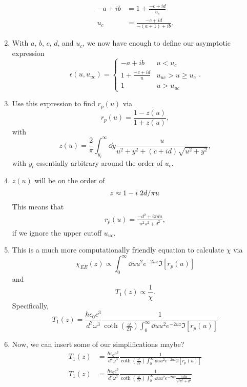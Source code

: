 \documentclass[../main.tex]{subfiles}
\begin{document}
\begin{enumerate}
\begin{align}
			-a + ib &= 1 + \frac{-c + id}{u_c} \\
			u_c &= \frac{-c + id}{-(a + 1) + ib}.
		\end{align}
		\item With $a$, $b$, $c$, $d$, and $u_c$, we now have enough to define our asymptotic expression
		\begin{equation}
			\epsilon(u, u_{uc}) =
			\begin{cases}
				-a + i b & u < u_c \\
				1 + \frac{-c + i d}{u} &  u_{uc} > u \geq u_c \\
				1 & u > u_{uc}
			\end{cases}.
		\end{equation}
		\item Use this expression to find $r_p(u)$ via
		\begin{equation}
			r_p(u) = \frac{1 - z(u)}{1 + z(u)},
		\end{equation}
		with
		\begin{equation}
			z(u) = \frac{2}{\pi} \int_{y_l}^{\infty} \dd{y} \frac{u}{u^2 + y^2 + (c + i d)\sqrt{u^2 + y^2}},
		\end{equation}
		with $y_l$ essentially arbitrary around the order of $u_c$.
		\item $z(u)$ will be on the order of
		\begin{equation}
			z \approx 1 - i \flatfrac{2 d}{\pi u}
		\end{equation}
		This means that 
		\begin{align}
			r_p(u) = \frac{-d^2 + i \pi d u}{u^2 \pi^2 + d^2},
		\end{align}
		if we ignore the upper cutoff $u_{uc}$.
		\item This is a much more computationally friendly equation to calculate $\chi$ via
		\begin{equation}
			\chi_{EE}(z) \propto \int_0^\infty \dd{u} u^2 e^{-2 u z} \Im[r_p(u)]
		\end{equation}
		and
		\begin{equation}
			T_1(z) \propto \frac{1}{\chi}.
		\end{equation}
		Specifically,
		\begin{equation}
			T_1(z) = \frac{\hbar \epsilon_0 c^{3}}{d^2 \omega^3} \frac{1}{\coth(\frac{\omega}{2 T}) \int_0^\infty \dd{u} u^2 e^{-2 u z} \Im[r_p(u)]}
		\end{equation}
		\item Now, we can insert some of our simplifications maybe?
		\begin{align}
			T_1(z) &= \frac{\hbar \epsilon_0 c^{3}}{d^2 \omega^3} \frac{1}{\coth(\frac{\omega}{2 T}) \int_0^\infty \dd{u} u^2 e^{-2 u z} \Im[r_p(u)]} \\
			T_1(z) &= \frac{\hbar \epsilon_0 c^{3}}{d^2 \omega^3} \frac{1}{\coth(\frac{\omega}{2 T}) \int_0^\infty \dd{u} u^2 e^{-2 u z} \frac{\pi d u}{u^2 \pi^2 + d^2}}
		\end{align}
	\end{enumerate}
\end{document}
